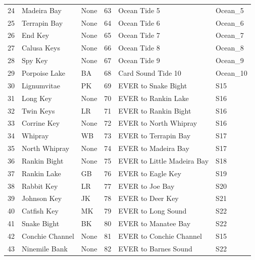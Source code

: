 \begin{table}[H]
\begin{tabular}{ l l l | l l l }
24    &  Madeira Bay             & None  & 63 & Ocean Tide 5        & Ocean\_5\\
25    &  Terrapin Bay            & None  & 64 & Ocean Tide 6        & Ocean\_6\\
26    &  End Key                 & None  & 65 & Ocean Tide 7        & Ocean\_7\\
27    &  Calusa Keys             & None  & 66 & Ocean Tide 8        & Ocean\_8\\
28    &  Spy Key                 & None  & 67 & Ocean Tide 9        & Ocean\_9\\
29    &  Porpoise Lake           & BA    & 68 & Card Sound Tide 10  & Ocean\_10\\
30    &  Lignumvitae             & PK    & 69 & EVER to Snake Bight     & S15\\
31    &  Long Key                & None  & 70 & EVER to Rankin Lake     & S16\\
32    &  Twin Keys               & LR    & 71 & EVER to Rankin Bight    & S16\\
33    &  Corrine Key             & None  & 72 & EVER to North Whipray   & S16\\
34    &  Whipray                 & WB    & 73 & EVER to Terrapin Bay    & S17\\
35    &  North Whipray           & None  & 74 & EVER to Madeira Bay     & S17\\
36    &  Rankin Bight            & None  & 75 & EVER to Little Madeira Bay & S18\\
37    & Rankin Lake              & GB    & 76 & EVER to Eagle Key       & S19\\
38    & Rabbit Key               & LR    & 77 & EVER to Joe Bay         & S20\\
39    & Johnson Key              & JK    & 78 & EVER to Deer Key        & S21\\
40    & Catfish Key              & MK    & 79 & EVER to Long Sound      & S22\\
41    & Snake Bight              & BK    & 80 & EVER to Manatee Bay     & S22\\
42    & Conchie Channel          & None  & 81 & EVER to Conchie Channel & S15\\
43    & Ninemile Bank            & None  & 82 & EVER to Barnes Sound    & S22\\
\hline
\end{tabular}
\label{table:Basins Stations}
\end{table}

